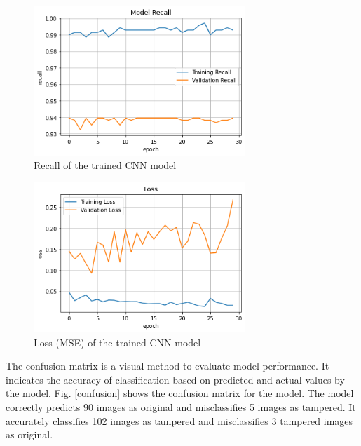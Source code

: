 \documentclass[conference]{IEEEtran}
\begin{document}
\begin{figure}[htpb]
\centerline{\includegraphics[width=8cm]{recall.png}}
\caption{Recall of the trained CNN model}
\label{recall}
\end{figure}

\begin{figure}[htpb]
\centerline{\includegraphics[width=8cm]{loss.png}}
\caption{Loss (MSE) of the trained CNN model}
\label{loss}
\end{figure}

The confusion matrix is a visual method to evaluate model performance. It indicates the accuracy of classification based on predicted and actual values by the model. Fig. \ref{confusion} shows the confusion matrix for the model. The model correctly predicts 90 images as original and misclassifies 5 images as tampered. It accurately classifies 102 images as tampered and misclassifies 3 tampered images as original.
\end{document}
